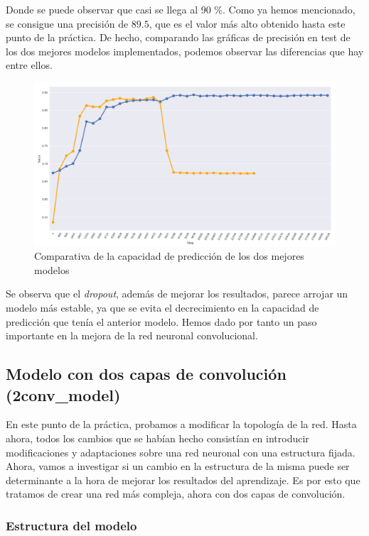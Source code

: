 \documentclass[11pt]{article}
\theoremstyle{plain}
\theoremstyle{definition}
\begin{document}
Donde se puede observar que casi se llega al 90 \%. Como ya hemos
mencionado, se consigue una precisión de $89.5$, que es el valor más
alto obtenido hasta este punto de la práctica. De hecho, comparando
las gráficas de precisión en test de los dos mejores modelos
implementados, podemos observar las diferencias que hay entre ellos.

\begin{figure}[H]
  \centering
  \includegraphics[width=.95\textwidth]{imgs/accuracy_comparison}
  \caption{Comparativa de la capacidad de predicción de los dos
    mejores modelos}
\end{figure}

Se observa que el \textit{dropout}, además de mejorar los resultados,
parece arrojar un modelo más estable, ya que se evita el decrecimiento
en la capacidad de predicción que tenía el anterior modelo. Hemos dado
por tanto un paso importante en la mejora de la red neuronal
convolucional.

\subsection{Modelo con dos capas de convolución (2conv\_model)}

En este punto de la práctica, probamos a modificar la topología de la
red. Hasta ahora, todos los cambios que se habían hecho consistían en
introducir modificaciones y adaptaciones sobre una red neuronal con
una estructura fijada. Ahora, vamos a investigar si un cambio en la
estructura de la misma puede ser determinante a la hora de mejorar los
resultados del aprendizaje. Es por esto que tratamos de crear una
red más compleja, ahora con dos capas de convolución.\\

\subsubsection{Estructura del modelo}
\end{document}
